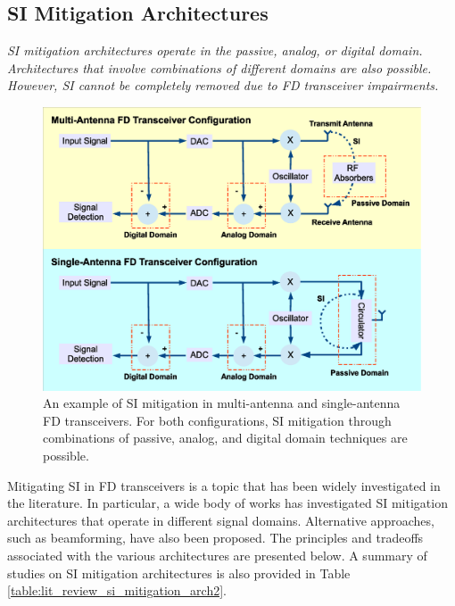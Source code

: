 \subsection{SI Mitigation Architectures}
\begin{summary} \emph{
\emph{SI mitigation architectures operate in the passive, analog, or digital domain. Architectures that involve combinations of different domains are also possible. However, SI cannot be completely removed due to FD transceiver impairments.}
}
\end{summary}

\begin{figure} [h]
\centering
\includegraphics [width=0.6\columnwidth]{chap2_fig/SI_mitigation_example.eps} 
\caption{An example of SI mitigation in multi-antenna and single-antenna FD transceivers. For both configurations, SI mitigation through combinations of passive, analog, and digital domain techniques are possible.}
\label{fig:lit_review_SI_mitigation_example}
\end{figure}

Mitigating SI in FD transceivers is a topic that has been widely investigated in the literature. In particular, a wide body of works has investigated SI mitigation architectures that operate in different signal domains. Alternative approaches, such as beamforming, have also been proposed. The principles and tradeoffs associated with the various architectures are presented below. A summary of studies on SI mitigation architectures is also provided in Table \ref{table:lit_review_si_mitigation_arch2}.

